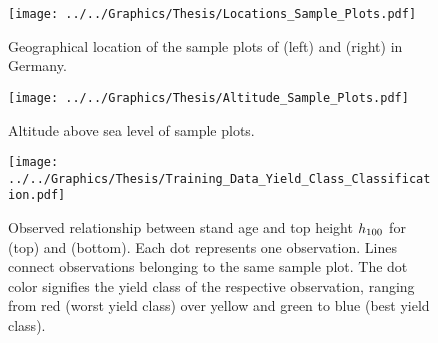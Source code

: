 \begin{figure}[H]
  \centering
  \texttt{[image: ../../Graphics/Thesis/Locations\_Sample\_Plots.pdf]}
  \caption{Geographical location of the sample plots of \beech{} (left) and \spruce{} (right) in Germany.}
  \label{fig:Locations_Sample_Plots}
\end{figure}

\begin{figure}[H]
  \centering
  \texttt{[image: ../../Graphics/Thesis/Altitude\_Sample\_Plots.pdf]}
  \caption{Altitude above sea level of sample plots.}
  \label{fig:Altitude_Sample_Plots}
\end{figure}

\newpage{}
\begin{figure}[H]
  \centering
  \texttt{[image: ../../Graphics/Thesis/Training\_Data\_Yield\_Class\_Classification.pdf]}
  \caption{Observed relationship between stand age and top height \(h_{100}\) for \beech{} (top) and \spruce{} (bottom).  Each dot represents one observation.  Lines connect observations belonging to the same sample plot.  The dot color signifies the yield class of the respective observation, ranging from red (worst yield class) over yellow and green to blue (best yield class).}
  \label{fig:Training_Data_Yield_Class_Classification}
\end{figure}


